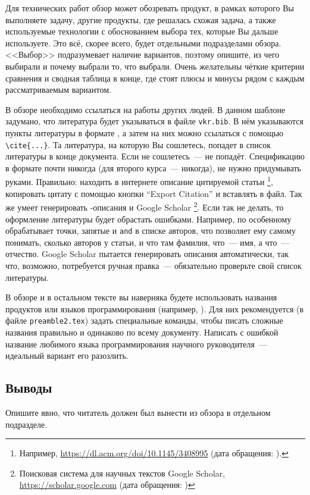 Для технических работ обзор может обозревать продукт, в рамках которого Вы выполняете задачу, другие продукты, где решалась схожая задача, а также используемые технологии с обоснованием выбора тех, которые Вы дальше используете.
Это всё, скорее всего, будет отдельными подразделами обзора.
<<Выбор>> подразумевает наличие вариантов, поэтому опишите, из чего выбирали и почему выбрали то, что выбрали.
Очень желательны чёткие критерии сравнения и сводная таблица в конце, где стоят плюсы и минусы рядом с каждым рассматриваемым вариантом.

В обзоре необходимо ссылаться на работы других людей.
В данном шаблоне задумано, что литература будет указываться в файле \verb=vkr.bib=.
В нём указываются пункты литературы в формате \BibTeX{}, а затем на них можно ссылаться с помощью \verb=\cite{...}=.
Та литература, на которую Вы сошлетесь, попадет в список литературы в конце документа.
Если не сошлетесь~---  не попадёт.
Спецификацию в формате \BibTeX{} почти никогда (для второго курса~--- никогда), не нужно придумывать руками.
Правильно: находить в интернете описание цитируемой статьи%
\footnote{Например, \url{https://dl.acm.org/doi/10.1145/3408995} (дата обращения: ).},
копировать цитату с помощью кнопки \foreignquote{english}{Export Citation} и вставлять в \BibTeX{} файл.
Так же умеет генерировать \BibTeX{}-описания и Google Scholar%
\footnote{Поисковая система для научных текстов Google Scholar, \url{https://scholar.google.com} (дата обращения: )}.
Если так не делать, то оформление литературы будет обрастать ошибками.
Например, \BibTeX{} по особенному обрабатывает точ\-ки, запятые и \verb=and= в списке авторов, что позволяет ему самому понимать, сколько авторов у статьи, и что там фамилия, что~--- имя, а что~--- отчество.
Google Scholar пытается генерировать описания автоматически, так что, возможно, потребуется ручная правка~--- обязательно проверьте свой список литературы.

В обзоре и в остальном тексте вы наверняка будете использовать названия продуктов или языков программирования (например, \csharp{}).
Для них рекоменду\-ется (в файле \verb=preamble2.tex=) за\-дать специальные команды, чтобы писать сложные названия правильно и одинаково по всему доку\-менту.
Написать с ошибкой  название любимого языка программирова\-ния науч\-ного руко\-водителя~--- идеальный вариант его разозлить.

\subsection{Выводы}

Опишите явно, что читатель должен был вынести из обзора в отдельном подразделе.
